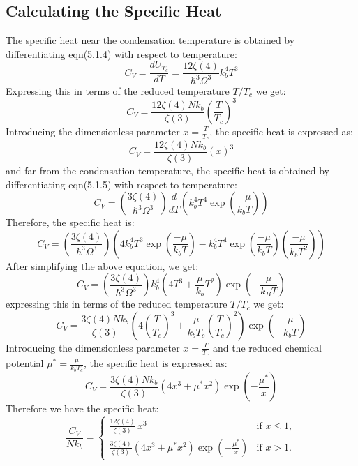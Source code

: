 \documentclass{article}
\numberwithin{equation}{section}
\numberwithin{equation}{subsection}
\begin{document}
\subsection{Calculating the Specific Heat}
The specific heat near the condensation temperature is obtained by differentiating eqn(5.1.4) with respect to temperature:
\begin{equation}
    C_V = \frac{dU_{T_c}}{dT} = \frac{12\zeta(4)}{\hbar^3\Omega^3}k_b^4T^3
\end{equation}
Expressing this in terms of the reduced temperature \( T/T_c \) we get:
\begin{equation}
    C_V = \frac{12\zeta(4) N k_b}{\zeta(3)} \left(\frac{T}{T_c}\right)^3
\end{equation}
Introducing the dimensionless parameter \( x = \frac{T}{T_c} \), the specific heat is expressed as:
\begin{equation}
    C_V = \frac{12\zeta(4) N k_b}{\zeta(3)} \left(x\right)^3
\end{equation}
and far from the condensation temperature, the specific heat is obtained by differentiating eqn(5.1.5) with respect to temperature:
\begin{equation}
    C_V = \left(\frac{3\zeta(4)}{\hbar^3\Omega^3}\right) \frac{d}{dT}\left(k_b^4T^4\exp\left(\frac{-\mu}{k_bT}\right)\right) 
\end{equation}
Therefore, the specific heat is:
\begin{equation}
    C_V = \left(\frac{3\zeta(4)}{\hbar^3\Omega^3}\right) \left(4k_b^4T^3\exp\left(\frac{-\mu}{k_bT}\right) - k_b^4T^4\exp\left(\frac{-\mu}{k_bT}\right)\left(\frac{-\mu}{k_bT^2}\right)\right)
\end{equation}
After simplifying the above equation, we get:
\begin{equation}
    C_V = \left(\frac{3\zeta(4)}{\hbar^3 \Omega^3}\right) k_b^4  \left( 4T^3 + \frac{\mu}{k_b} T^2 \right) \exp\left(-\frac{\mu}{k_B T}\right)
\end{equation}
expressing this in terms of the reduced temperature \( T/T_c \) we get:
\begin{equation}
    C_V = \frac{3\zeta(4) N k_b}{\zeta(3)}  \left( 4\left(\frac{T}{T_c}\right)^3 + \frac{\mu}{k_b T_c} \left(\frac{T}{T_c}\right)^2 \right)\exp\left(-\frac{\mu}{k_b T}\right)
\end{equation}
Introducing the dimensionless parameter \( x = \frac{T}{T_c} \) and the reduced chemical potential \( \mu^* = \frac{\mu}{k_b T_c} \), the specific heat is expressed as:
\begin{equation}
    C_V = \frac{3\zeta(4) N k_b}{\zeta(3)}  \left( 4x^3 + \mu^* x^2 \right)\exp\left(-\frac{\mu^*}{x}\right)
\end{equation}
Therefore we have the specific heat:
\begin{equation}
    \frac{C_V}{N k_b} = 
\begin{cases} 
\frac{12 \zeta(4) }{\zeta(3)} \, x^3 & \text{if } x \leq 1, \\[8pt]
\frac{3 \zeta(4) }{\zeta(3)} \left( 4x^3 + \mu^* x^2 \right) \exp\left(-\frac{\mu^*}{x}\right) & \text{if } x > 1.
\end{cases}
\end{equation}
\end{document}
